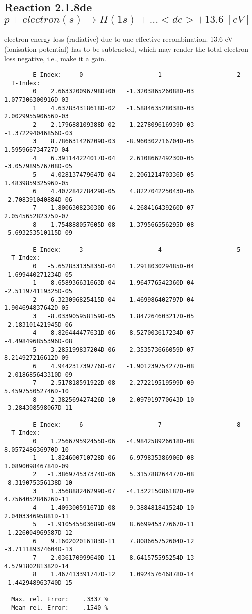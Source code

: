 \documentclass[12pt]{article}
\begin{document}
\subsection{
  Reaction 2.1.8de $p + electron(s) \rightarrow H(1s) + ...   <de>+13.6 \ [eV] $
}

  electron energy loss (radiative) due to one effective recombination.
  13.6 eV (ionisation potential) has to be
  subtracted, which may render the total electron loss negative, i.e., make it a gain.

\begin{small}\begin{verbatim}
        E-Index:     0                     1                     2
  T-Index:
        0    2.663320096798D+00   -1.320386526088D-03    1.077306300916D-03
        1    4.637834318618D-02   -1.588463528038D-03    2.002995590656D-03
        2    2.179688109388D-02    1.227809616939D-03   -1.372294046856D-03
        3    8.786631426209D-03   -8.960302716704D-05    1.595966734727D-04
        4    6.391144224017D-04    2.610866249230D-05   -3.057989576708D-05
        5   -4.028137479647D-04   -2.206121470336D-05    1.483985932596D-05
        6    4.407284278429D-05    4.822704225043D-06   -2.708391040884D-06
        7   -1.800630823030D-06   -4.268416439260D-07    2.054565282375D-07
        8    1.754888057605D-08    1.379566556295D-08   -5.693253510115D-09

        E-Index:     3                     4                     5
  T-Index:
        0   -5.652833135835D-04    1.291803029485D-04   -1.699440271234D-05
        1   -8.658936631663D-04    1.964776542360D-04   -2.511974119325D-05
        2    6.323096825415D-04   -1.469986402797D-04    1.904694837642D-05
        3   -8.033905958159D-05    1.847264603217D-05   -2.183101421945D-06
        4    8.826444477631D-06   -8.527003617234D-07   -4.498496855396D-08
        5   -3.285199837204D-06    2.353573666059D-07    8.214927216612D-09
        6    4.944231739776D-07   -1.901239754277D-08   -2.018685643310D-09
        7   -2.517818591922D-08   -2.272219519599D-09    5.459755052746D-10
        8    2.382569427426D-10    2.097919770643D-10   -3.284308598067D-11

        E-Index:     6                     7                     8
  T-Index:
        0    1.256679592455D-06   -4.984258926618D-08    8.057248636970D-10
        1    1.824600710728D-06   -6.979835386906D-08    1.089009846784D-09
        2   -1.386974537374D-06    5.315788264477D-08   -8.319075356138D-10
        3    1.356888246299D-07   -4.132215086182D-09    4.756405284626D-11
        4    1.409300591671D-08   -9.388481841524D-10    2.040334695881D-11
        5   -1.910545503689D-09    8.669945377667D-11   -1.226004969587D-12
        6    9.160202016183D-11    7.808665752604D-12   -3.711189374604D-13
        7   -2.036170999640D-11   -8.641575595254D-13    4.579180281382D-14
        8    1.467413391747D-12    1.092457646878D-14   -1.442948963740D-15

  Max. rel. Error:    .3337 %
  Mean rel. Error:    .1540 %

\end{verbatim}\end{small}
\end{document}
